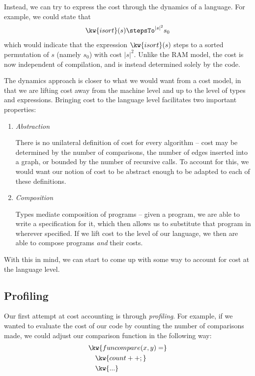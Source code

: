 \documentclass[letterpaper]{article}
\begin{document}
Instead, we can try to express the cost through the dynamics of a language. For example, we could state that
\[\kw{isort}(s) \stepsTo^{|s|^2} s_0\]
which would indicate that the expression $\kw{isort}(s)$ steps to a sorted permutation of $s$ (namely $s_0$) with cost $|s|^2$. Unlike the RAM model,
the cost is now independent of compilation, and is instead determined solely by the code.

The dynamics approach is closer to what we would want from a cost model, in that we are lifting cost away from the machine level and up to the level of types and expressions.
Bringing cost to the language level facilitates two important properties:
\begin{enumerate}
    \item \textit{Abstraction}

    There is no unilateral definition of cost for every algorithm -- cost may be determined by the number of comparisons, the number of edges inserted into a graph, or bounded by
    the number of recursive calls. To account for this, we would want our notion of cost to be abstract enough to be adapted to each of these definitions.

    \item \textit{Composition}

    Types mediate composition of programs -- given a program, we are able to write a specification for it, which then allows us to substitute that program in wherever specified.
    If we lift cost to the level of our language, we then are able to compose programs \textit{and} their costs.
\end{enumerate}

With this in mind, we can start to come up with some way to account for cost at the language level.

\subsection{Profiling}

Our first attempt at cost accounting is through \textit{profiling}. For example, if we wanted to evaluate the cost
of our code by counting the number of comparisons made, we could adjust our comparison function in the following way:
\begin{align*}
    &\kw{fun compare (x, y) =}\\
    &\quad \kw{count++;}\\
    &\quad \kw{...}
\end{align*}
\end{document}
